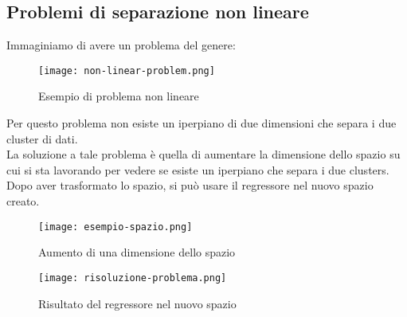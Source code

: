     \subsection{Problemi di separazione non lineare}
        Immaginiamo di avere un problema del genere:

        \begin{figure}[h]
            \caption{Esempio di problema non lineare}
            \centering
            \texttt{[image: non-linear-problem.png]}
        \end{figure}

        Per questo problema non esiste un iperpiano di due dimensioni che separa i due cluster di dati.
        \\
        La soluzione a tale problema è quella di aumentare la dimensione dello spazio su cui si sta lavorando per vedere se esiste un iperpiano che separa i due clusters.
        Dopo aver trasformato lo spazio, si può usare il regressore nel nuovo spazio creato.

        \begin{figure}[h]
            \caption{Aumento di una dimensione dello spazio}
            \centering
            \texttt{[image: esempio-spazio.png]}
        \end{figure}

        \begin{figure}[h]
            \caption{Risultato del regressore nel nuovo spazio}
            \centering
            \texttt{[image: risoluzione-problema.png]}
        \end{figure}

    \clearpage